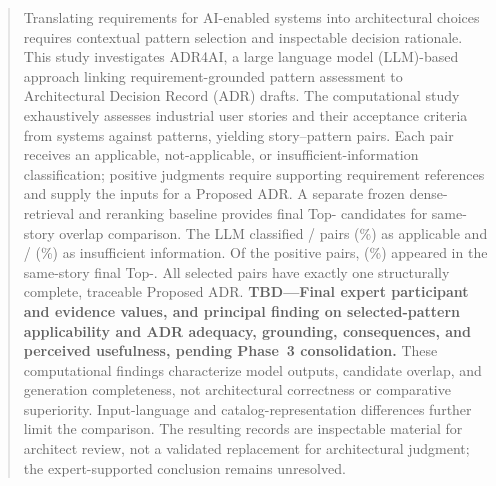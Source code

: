 \begin{abstract}
Translating requirements for AI-enabled systems into architectural choices
requires contextual pattern selection and inspectable decision rationale.
This study investigates ADR4AI, a large language model (LLM)-based approach
linking requirement-grounded pattern assessment to Architectural Decision
Record (ADR) drafts. The computational study exhaustively assesses
\StudyStoryCount{} industrial user stories and their acceptance criteria from
\StudySystemCount{} systems against \StudyPatternCount{} patterns, yielding
\StudyAssessmentCount{} story--pattern pairs. Each pair receives an applicable,
not-applicable, or insufficient-information classification; positive judgments
require supporting requirement references and supply the inputs for a Proposed
ADR. A separate frozen dense-retrieval and reranking baseline provides final
Top-\RagFinalCount{} candidates for same-story overlap comparison.
The LLM classified \StudyApplicableCount{}/\StudyAssessmentCount{} pairs
(\RqOneApplicablePercent{}\%) as applicable and
\StudyInsufficientInformationCount{}/\StudyAssessmentCount{}
(\RqOneInsufficientInformationPercent{}\%) as insufficient information.
Of the \StudyApplicableCount{} positive pairs, \StudyRagOverlapCount{}
(\RqTwoOverlapPercent{}\%) appeared in the same-story final
Top-\RagFinalCount{}. All \StudyApplicableCount{} selected pairs have exactly
one structurally complete, traceable Proposed ADR.
\textbf{TBD---Final expert participant and evidence values, and principal
finding on selected-pattern applicability and ADR adequacy, grounding,
consequences, and perceived usefulness, pending Phase~3 consolidation.}
These computational findings characterize model outputs, candidate overlap,
and generation completeness, not architectural correctness or comparative
superiority. Input-language and catalog-representation differences further
limit the comparison. The resulting records are inspectable material for
architect review, not a validated replacement for architectural judgment;
the expert-supported conclusion remains unresolved.
\end{abstract}
